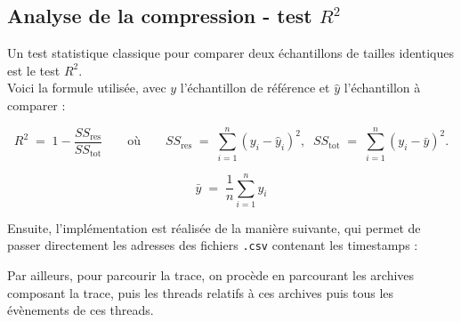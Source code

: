\subsection{Analyse de la compression - test $R^2$}\label{ssec:comp}

Un test statistique classique pour comparer deux échantillons de tailles identiques est le test $R^2$.\\
Voici la formule utilisée, avec $y$ l'échantillon de référence et $\hat{y}$ l'échantillon à comparer :

\[
R^2 \;=\; 1 - \frac{SS_{\mathrm{res}}}{SS_{\mathrm{tot}}}
\qquad\text{où}\qquad
SS_{\mathrm{res}} \;=\; \sum_{i=1}^{n} (y_i - \hat{y}_i)^2,
\;\;
SS_{\mathrm{tot}} \;=\; \sum_{i=1}^{n} (y_i - \bar{y})^2.
\]

\[
\bar{y} \;=\; \frac{1}{n}\sum_{i=1}^{n} y_i\]


Ensuite, l'implémentation est réalisée de la manière suivante, qui permet de passer directement les adresses des fichiers \verb!.csv! contenant les timestamps :


Par ailleurs, pour parcourir la trace, on procède en parcourant les archives composant la trace, puis les threads relatifs à ces archives puis tous les évènements de ces threads.

